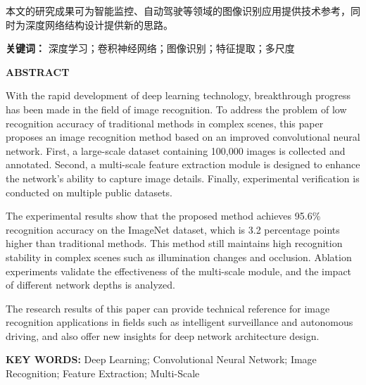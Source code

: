 \documentclass[a4paper,12pt]{article}
\begin{document}
本文的研究成果可为智能监控、自动驾驶等领域的图像识别应用提供技术参考，同时为深度网络结构设计提供新的思路。

\vspace{0.5cm}

\noindent\textbf{关键词：} 深度学习；卷积神经网络；图像识别；特征提取；多尺度

\newpage
\thispagestyle{plain}
{}

\begin{center}
    {\fontsize{16pt}{24pt}\selectfont\textbf{ABSTRACT}}
\end{center}

\vspace{0.5cm}

With the rapid development of deep learning technology, breakthrough progress has been made in the field of image recognition. To address the problem of low recognition accuracy of traditional methods in complex scenes, this paper proposes an image recognition method based on an improved convolutional neural network. First, a large-scale dataset containing 100,000 images is collected and annotated. Second, a multi-scale feature extraction module is designed to enhance the network's ability to capture image details. Finally, experimental verification is conducted on multiple public datasets.

The experimental results show that the proposed method achieves 95.6\% recognition accuracy on the ImageNet dataset, which is 3.2 percentage points higher than traditional methods. This method still maintains high recognition stability in complex scenes such as illumination changes and occlusion. Ablation experiments validate the effectiveness of the multi-scale module, and the impact of different network depths is analyzed.

The research results of this paper can provide technical reference for image recognition applications in fields such as intelligent surveillance and autonomous driving, and also offer new insights for deep network architecture design.

\vspace{0.5cm}

\noindent\textbf{KEY WORDS:} Deep Learning; Convolutional Neural Network; Image Recognition; Feature Extraction; Multi-Scale

\newpage
\thispagestyle{plain}
\renewcommand{\contentsname}{目\quad 录}
{}
\tableofcontents
\end{document}
